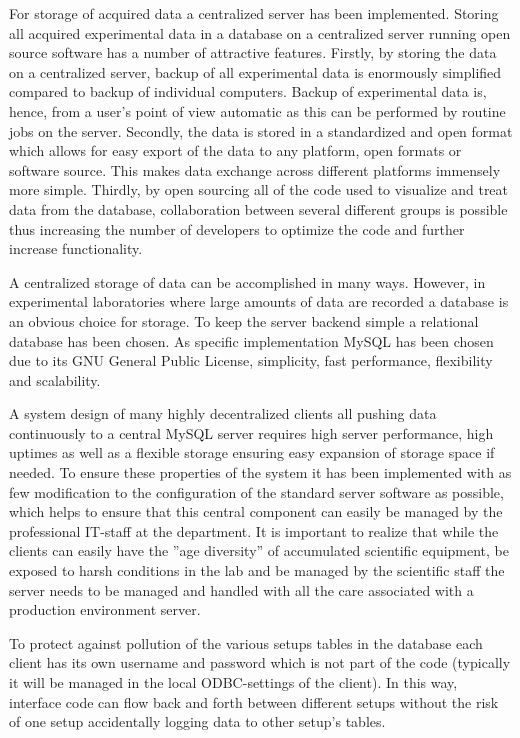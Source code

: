For storage of acquired data a centralized server has been implemented. Storing
all acquired experimental data in a database on a centralized server running
open source software has a number of attractive features. Firstly, by storing
the data on a centralized server, backup of all experimental data is enormously
simplified compared to backup of individual computers. Backup of experimental
data is, hence, from a user's point of view automatic as this can be performed
by routine jobs on the server. Secondly, the data is stored in a standardized
and open format which allows for easy export of the data to any platform, open
formats or software source. This makes data exchange across different platforms
immensely more simple. Thirdly, by open sourcing all of the code used to
visualize and treat data from the database, collaboration between several
different groups is possible thus increasing the number of developers to
optimize the code and further increase functionality.

A centralized storage of data can be accomplished in many ways. However, in
experimental laboratories where large amounts of data are recorded a database
is an obvious choice for storage. To keep the server backend simple a
relational database has been chosen. As specific implementation MySQL has been
chosen due to its GNU General Public License\cite{gpl}, simplicity, fast
performance, flexibility and scalability.

A system design of many highly decentralized clients all pushing data
continuously to a central MySQL server requires high server performance, high
uptimes as well as a flexible storage ensuring easy expansion of storage space
if needed. To ensure these properties of the system it has been implemented
with as few modification to the configuration of the standard server software
as possible, which helps to ensure that this central component can easily be
managed by the professional IT-staff at the department. It is important to
realize that while the clients can easily have the ''age diversity'' of
accumulated scientific equipment, be exposed to harsh conditions in the lab and
be managed by the scientific staff the server needs to be managed and handled
with all the care associated with a production environment server.

To protect against pollution of the various setups tables in the database each
client has its own username and password which is not part of the code
(typically it will be managed in the local ODBC-settings of the client). In
this way, interface code can flow back and forth between different setups
without the risk of one setup accidentally logging data to other setup's
tables.


